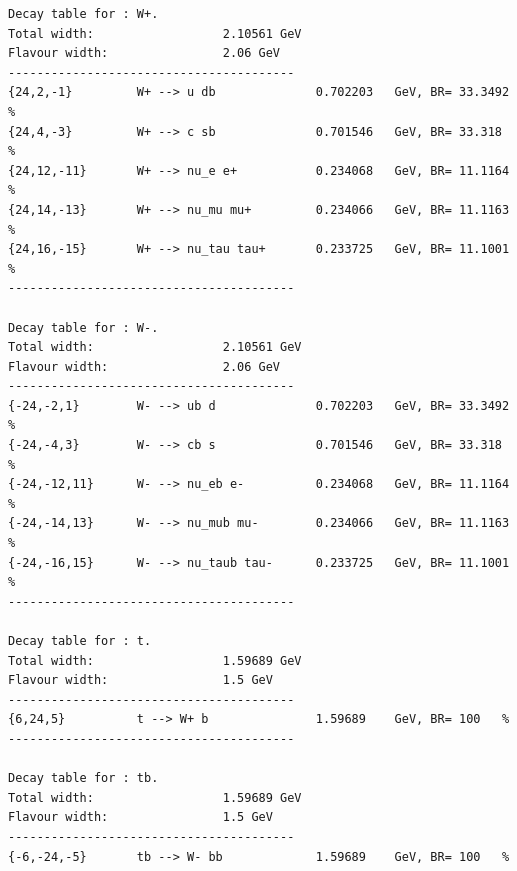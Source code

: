 \documentclass[12pt]{article}
\begin{document}
\begin{verbatim}
Decay table for : W+.
Total width:                  2.10561 GeV
Flavour width:                2.06 GeV
----------------------------------------
{24,2,-1}         W+ --> u db              0.702203   GeV, BR= 33.3492 %
{24,4,-3}         W+ --> c sb              0.701546   GeV, BR= 33.318 %
{24,12,-11}       W+ --> nu_e e+           0.234068   GeV, BR= 11.1164 %
{24,14,-13}       W+ --> nu_mu mu+         0.234066   GeV, BR= 11.1163 %
{24,16,-15}       W+ --> nu_tau tau+       0.233725   GeV, BR= 11.1001 %
----------------------------------------

Decay table for : W-.
Total width:                  2.10561 GeV
Flavour width:                2.06 GeV
----------------------------------------
{-24,-2,1}        W- --> ub d              0.702203   GeV, BR= 33.3492 %
{-24,-4,3}        W- --> cb s              0.701546   GeV, BR= 33.318 %
{-24,-12,11}      W- --> nu_eb e-          0.234068   GeV, BR= 11.1164 %
{-24,-14,13}      W- --> nu_mub mu-        0.234066   GeV, BR= 11.1163 %
{-24,-16,15}      W- --> nu_taub tau-      0.233725   GeV, BR= 11.1001 %
----------------------------------------

Decay table for : t.
Total width:                  1.59689 GeV
Flavour width:                1.5 GeV
----------------------------------------
{6,24,5}          t --> W+ b               1.59689    GeV, BR= 100   %
----------------------------------------

Decay table for : tb.
Total width:                  1.59689 GeV
Flavour width:                1.5 GeV
----------------------------------------
{-6,-24,-5}       tb --> W- bb             1.59689    GeV, BR= 100   %

\end{verbatim}

\end{document}
